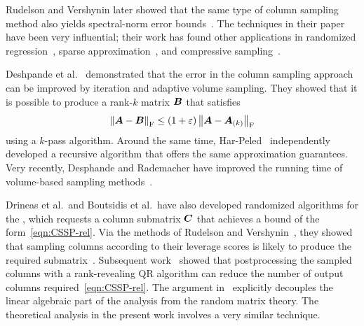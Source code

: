 \documentclass[final]{siamltex}
\newcounter{algorithm}[section]
\begin{document}

Rudelson and Vershynin later showed that the same type of column sampling method also
yields spectral-norm error bounds~\cite{RV07:Sampling-Large}.  The
techniques in their paper have been very influential; their work has
found other applications in randomized regression~\cite{DMMS09:Faster-Least},
sparse approximation~\cite{Tro08:Conditioning-Random}, and compressive
sampling~\cite{CR07:Sparsity-Incoherence}.

Deshpande et al.~\cite{DRVW06:Matrix-Approximation,deshpande_vempala} demonstrated that the error
in the column sampling approach can be improved by iteration and adaptive volume sampling.
They showed that it is possible to produce a rank-$k$ matrix $\bm{B}$ that satisfies
\begin{equation} \label{eqn:colselect-rel}
\fnorm{ \mtx{A} - \mtx{B} } \leq (1 + \eps) \fnorm{ \mtx{A} - \mtx{A}_{(k)} }
\end{equation}
using a $k$-pass algorithm.  Around the same time, Har-Peled~\cite{Har06:Matrix-Approximation}
independently developed a recursive algorithm that offers the same approximation guarantees.
Very recently, Desphande and Rademacher have improved the running time of volume-based
sampling methods~\cite{DR10:Efficient-Volume}.

Drineas et al.~and Boutsidis et al.~have also developed randomized algorithms for the
, which requests a column submatrix $\bm{C}$
that achieves a bound of the form~\eqref{eqn:CSSP-rel}.
Via the methods of Rudelson and Vershynin~\cite{RV07:Sampling-Large}, they showed
that sampling columns according to their leverage scores is likely
to produce the required submatrix~\cite{DMM06:Subspace-Sampling,DMM08:Relative-Error}.
Subsequent
work~\cite{BMD09:Improved-Approximation,BDM08:Unsupervised-Feature}
showed that postprocessing the sampled columns with a rank-revealing QR
algorithm can reduce the number of output columns required~\eqref{eqn:CSSP-rel}.
The argument in~\cite{BMD09:Improved-Approximation} explicitly decouples the
linear algebraic part of the analysis from the random matrix theory.
The theoretical analysis in the present work involves a very similar technique.
\end{document}
